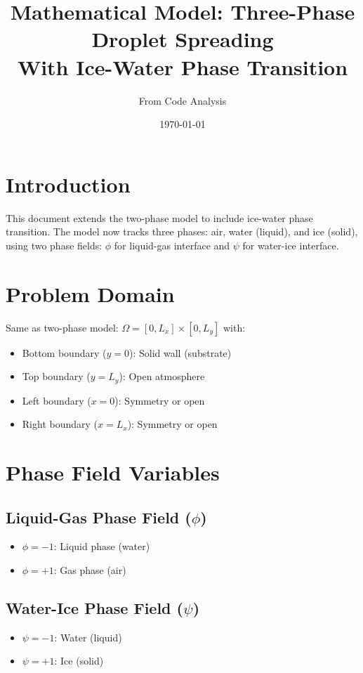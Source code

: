 \documentclass[12pt]{article}
\title{Mathematical Model: Three-Phase Droplet Spreading\\With Ice-Water Phase Transition}
\author{From Code Analysis}
\date{\today}
\begin{document}
\maketitle

\section{Introduction}

This document extends the two-phase model to include ice-water phase transition. The model now tracks three phases: air, water (liquid), and ice (solid), using two phase fields: $\phi$ for liquid-gas interface and $\psi$ for water-ice interface.

\section{Problem Domain}

Same as two-phase model: $\Omega = [0, L_x] \times [0, L_y]$ with:
\begin{itemize}
    \item Bottom boundary ($y = 0$): Solid wall (substrate)
    \item Top boundary ($y = L_y$): Open atmosphere
    \item Left boundary ($x = 0$): Symmetry or open
    \item Right boundary ($x = L_x$): Symmetry or open
\end{itemize}

\section{Phase Field Variables}

\subsection{Liquid-Gas Phase Field ($\phi$)}

\begin{itemize}
    \item $\phi = -1$: Liquid phase (water)
    \item $\phi = +1$: Gas phase (air)
\end{itemize}

\subsection{Water-Ice Phase Field ($\psi$)}

\begin{itemize}
    \item $\psi = -1$: Water (liquid)
    \item $\psi = +1$: Ice (solid)
\end{itemize}
\end{document}
